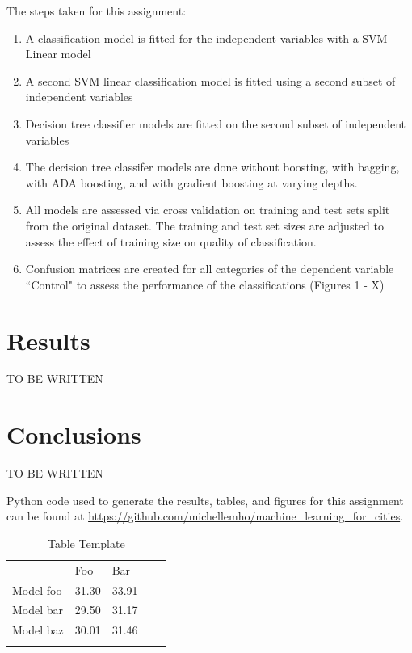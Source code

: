 \documentclass[10pt,twocolumn]{article}
\begin{document}
The steps taken for this assignment:

\begin{enumerate}
\item A classification model is fitted for the independent variables with
a SVM Linear model
\item A second SVM linear classification model is fitted using a second subset
of independent variables
\item Decision tree classifier models are fitted on the second subset of independent variables
\item The decision tree classifer models are done without boosting, with bagging,
with ADA boosting, and with gradient boosting at varying depths.
\item All models are assessed via cross validation on training and test sets split
from the original dataset. The training and test set sizes are adjusted to assess the effect of training size on quality
of classification.
\item Confusion matrices are created for all categories of the dependent variable
``Control" to assess the performance of the classifications (Figures 1 - X)
\end{enumerate}

\section{Results}

TO BE WRITTEN

\section{Conclusions}

TO BE WRITTEN

Python code used to generate the results, tables, and figures for this assignment can be
found at \url{https://github.com/michellemho/machine_learning_for_cities}.

\begin{center}
\begin{table}[]
\centering
\caption{Table Template}
\label{my-label}
\begin{tabular}{lllll}
                & Foo & Bar \\
Model foo        & 31.30              & 33.91                  & \\
Model bar    & 29.50              & 31.17               & \\
Model baz     & 30.01               & 31.46                & \\
                &                           &                         &
\end{tabular}
\end{table}
\end{center}
\end{document}
